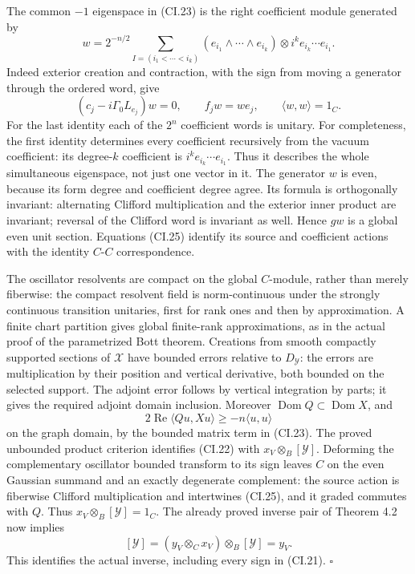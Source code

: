 \documentclass[
  11pt,
]{article}
\begin{document}
The common \(-1\) eigenspace in (CI.23) is the right coefficient module
generated by \[
 w=2^{-n/2}\sum_{I=(i_1<\cdots<i_k)}
       (e_{i_1}\wedge\cdots\wedge e_{i_k})
             \otimes i^k e_{i_k}\cdots e_{i_1}.
 \tag{CI.24}
\] Indeed exterior creation and contraction, with the sign from moving a
generator through the ordered word, give \[
 (c_j-i\Gamma_0L_{e_j})w=0,\qquad
 f_jw=w e_j,\qquad
 \langle w,w\rangle=1_C.
 \tag{CI.25}
\] For the last identity each of the \(2^n\) coefficient words is
unitary. For completeness, the first identity determines every
coefficient recursively from the vacuum coefficient: its degree-\(k\)
coefficient is \(i^ke_{i_k}\cdots e_{i_1}\). Thus it describes the whole
simultaneous eigenspace, not just one vector in it. The generator \(w\)
is even, because its form degree and coefficient degree agree. Its
formula is orthogonally invariant: alternating Clifford multiplication
and the exterior inner product are invariant; reversal of the Clifford
word is invariant as well. Hence \(gw\) is a global even unit section.
Equations (CI.25) identify its source and coefficient actions with the
identity \(C\)-\(C\) correspondence.

The oscillator resolvents are compact on the global \(C\)-module, rather
than merely fiberwise: the compact resolvent field is norm-continuous
under the strongly continuous transition unitaries, first for rank ones
and then by approximation. A finite chart partition gives global
finite-rank approximations, as in the actual proof of the parametrized
Bott theorem. Creations from smooth compactly supported sections of
\(\mathcal X\) have bounded errors relative to \(D_{\mathcal Y}\): the
errors are multiplication by their position and vertical derivative,
both bounded on the selected support. The adjoint error follows by
vertical integration by parts; it gives the required adjoint domain
inclusion. Moreover \(\operatorname{Dom}Q\subset\operatorname{Dom}X\),
and \[
 2\operatorname{Re}\langle Q u,Xu\rangle
       \geq-n\langle u,u\rangle
\] on the graph domain, by the bounded matrix term in (CI.23). The
proved unbounded product criterion identifies (CI.22) with
\(x_V\otimes_B[\mathcal Y]\). Deforming the complementary oscillator
bounded transform to its sign leaves \(C\) on the even Gaussian summand
and an exactly degenerate complement: the source action is fiberwise
Clifford multiplication and intertwines (CI.25), and it graded commutes
with \(Q\). Thus \(x_V\otimes_B[\mathcal Y]=1_C\). The already proved
inverse pair of Theorem 4.2 now implies \[
 [\mathcal Y]
  =(y_V\otimes_C x_V)\otimes_B[\mathcal Y]=y_V .
\] This identifies the actual inverse, including every sign in (CI.21).
\(\square\)
\end{document}
